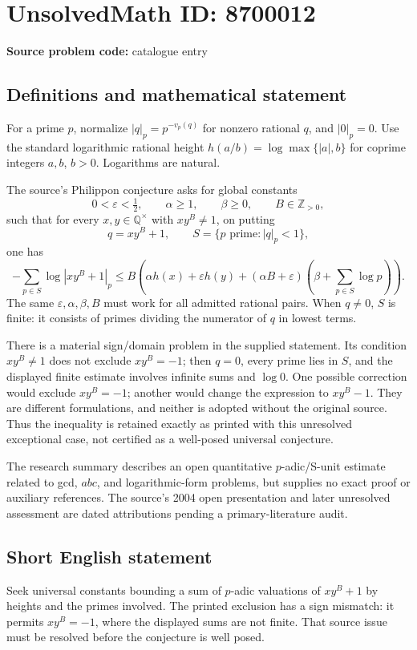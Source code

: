 \documentclass[11pt]{article}
\begin{document}
\section*{UnsolvedMath ID: 8700012}
\textbf{Source problem code:} catalogue entry
\subsection{Definitions and mathematical statement}
For a prime \(p\), normalize \(|q|_p=p^{-v_p(q)}\) for nonzero rational \(q\), and \(|0|_p=0\). Use the standard logarithmic rational height \(h(a/b)=\log\max\{|a|,b\}\) for coprime integers \(a,b\), \(b>0\). Logarithms are natural.

The source's Philippon conjecture asks for global constants
\[
 0<\varepsilon<\tfrac12,\qquad\alpha\ge1,\qquad\beta\ge0,
 \qquad B\in\mathbb Z_{>0},
\]
such that for every \(x,y\in\mathbb Q^\times\) with \(xy^B\ne1\), on putting
\[
 q=xy^B+1,\qquad S=\{p\text{ prime}:|q|_p<1\},
\]
one has
\[
 -\sum_{p\in S}\log|xy^B+1|_p
 \le B\left(\alpha h(x)+\varepsilon h(y)
 +(\alpha B+\varepsilon)\left(\beta+\sum_{p\in S}\log p\right)\right).
\]
The same \(\varepsilon,\alpha,\beta,B\) must work for all admitted rational pairs. When \(q\ne0\), \(S\) is finite: it consists of primes dividing the numerator of \(q\) in lowest terms.

There is a material sign/domain problem in the supplied statement. Its condition \(xy^B\ne1\) does not exclude \(xy^B=-1\); then \(q=0\), every prime lies in \(S\), and the displayed finite estimate involves infinite sums and \(\log0\). One possible correction would exclude \(xy^B=-1\); another would change the expression to \(xy^B-1\). They are different formulations, and neither is adopted without the original source. Thus the inequality is retained exactly as printed with this unresolved exceptional case, not certified as a well-posed universal conjecture.

The research summary describes an open quantitative \(p\)-adic/S-unit estimate related to gcd, \(abc\), and logarithmic-form problems, but supplies no exact proof or auxiliary references. The source's 2004 open presentation and later unresolved assessment are dated attributions pending a primary-literature audit.
\subsection{Short English statement}
Seek universal constants bounding a sum of \(p\)-adic valuations of \(xy^B+1\) by heights and the primes involved. The printed exclusion has a sign mismatch: it permits \(xy^B=-1\), where the displayed sums are not finite. That source issue must be resolved before the conjecture is well posed.
\end{document}
